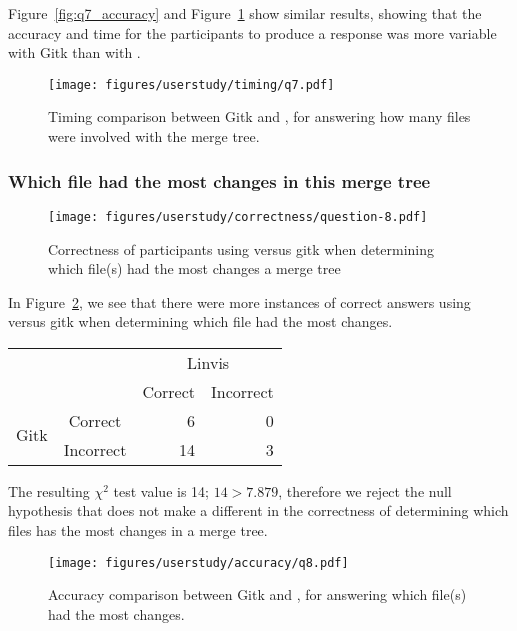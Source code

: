Figure~\ref{fig:q7_accuracy} and Figure~\ref{fig:q7_timing} show similar
results, showing that the accuracy and time for the participants to
produce a response was more variable with Gitk than with \tool.

\begin{figure}[htpb]
  \centering
  \texttt{[image: figures/userstudy/timing/q7.pdf]}
  \caption{Timing comparison between Gitk and \tool, for answering how
    many files were involved with the merge tree.}
  \label{fig:q7_timing}
\end{figure}


\subsubsection{Which file had the most changes in this merge tree}
\label{ssub:which_file_had_the_most_changes_in_this_merge_tree}

\begin{figure}[htpb]
  \centering
  \texttt{[image: figures/userstudy/correctness/question-8.pdf]}
  \caption{Correctness of participants using \tool versus gitk when
    determining which file(s) had the most changes a merge tree}
  \label{fig:q_8_correctness}
\end{figure}

In Figure~\ref{fig:q_8_correctness}, we see that there were more
instances of correct answers using \tool versus gitk when determining
which file had the most changes.

\begin{center}
  \begin{tabular}{cc|rr}
                           &           & \multicolumn{2}{c}{Linvis}\\
                           &           & Correct                      & Incorrect\\\hline
    \multirow{2}{*}{Gitk}  & Correct   & 6                            & 0\\
                           & Incorrect & 14                           & 3\\
  \end{tabular}
\end{center}

The resulting $\chi^2$ test value is 14; $14 > 7.879$, therefore we
reject the null hypothesis that \tool does not make a different in the
correctness of determining which files has the most changes in a merge
tree.

\begin{figure}[htpb]
  \centering
  \texttt{[image: figures/userstudy/accuracy/q8.pdf]}
  \caption{Accuracy comparison between Gitk and \tool, for answering
    which file(s) had the most changes.}
  \label{fig:q8_accuracy}
\end{figure}

